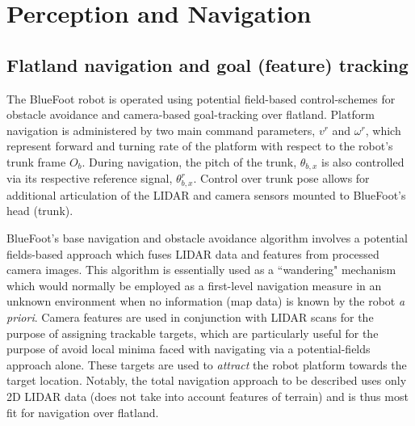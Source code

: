 \chapter{Perception and Navigation}
\label{ch::navigation}


	\section{Flatland navigation and goal (feature) tracking}
	
		The BlueFoot robot is operated using potential field-based control-schemes for obstacle avoidance and camera-based goal-tracking over flatland. Platform navigation is administered by two main command parameters, $v^{r}$ and $\omega^{r}$, which represent forward and turning rate of the platform with respect to the robot's trunk frame $O_{b}$. During navigation, the pitch of the trunk, $\theta_{b,x}$ is also controlled via its respective reference signal, $\theta_{b,x}^{r}$. Control over trunk pose allows for additional articulation of the LIDAR and camera sensors mounted to BlueFoot's head (trunk). 

		BlueFoot's base navigation and obstacle avoidance algorithm involves a potential fields-based approach which fuses LIDAR data and features from processed camera images. This algorithm is essentially used as a ``wandering" mechanism which would normally be employed as a first-level navigation measure in an unknown environment when no information (\EG map data) is known by the robot \emph{a priori}. Camera features are used in conjunction with LIDAR scans for the purpose of assigning trackable targets, which are particularly useful for the purpose of avoid local minima faced with navigating via a potential-fields approach alone. These targets are used to \emph{attract} the robot platform towards the target location. Notably, the total navigation approach to be described uses only 2D LIDAR data (does not take into account features of terrain) and is thus most fit for navigation over flatland.

